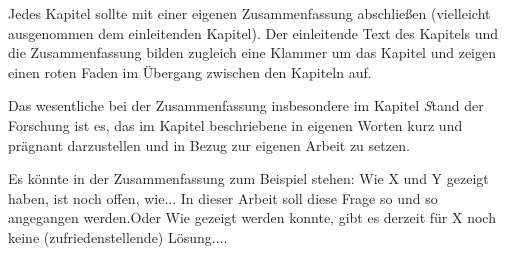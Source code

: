 Jedes Kapitel sollte mit einer eigenen Zusammenfassung abschließen (vielleicht
ausgenommen dem einleitenden Kapitel). Der einleitende Text des Kapitels und die
Zusammenfassung bilden zugleich eine Klammer um das Kapitel und zeigen einen
roten Faden im Übergang zwischen den Kapiteln auf. 

Das wesentliche bei der Zusammenfassung insbesondere im Kapitel {\emph Stand der
Forschung} ist es, das im Kapitel beschriebene in eigenen Worten kurz und prägnant
darzustellen und in Bezug zur eigenen Arbeit zu setzen.

Es könnte in der Zusammenfassung zum Beispiel stehen: \glqq Wie X und Y gezeigt
haben, ist noch offen, wie... In dieser Arbeit soll diese Frage so und so
angegangen werden.\grqq Oder \glqq Wie gezeigt werden konnte, gibt es derzeit für X
noch keine (zufriedenstellende) Lösung...\grqq.
